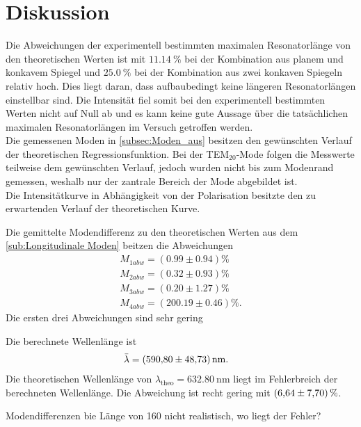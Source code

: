 \section{Diskussion}
\label{sec:Diskussion}

Die Abweichungen der experimentell bestimmten maximalen Resonatorlänge von den theoretischen Werten ist mit $\qty{11.14}{\percent}$ bei der Kombination
aus planem und konkavem Spiegel und $\qty{25.0}{\percent}$ bei der Kombination aus zwei konkaven Spiegeln relativ hoch.
Dies liegt daran, dass aufbaubedingt keine längeren Resonatorlängen einstellbar sind. Die Intensität fiel somit bei den experimentell bestimmten
Werten nicht auf Null ab und es kann keine gute Aussage über die tatsächlichen maximalen Resonatorlängen im Versuch getroffen werden.\\

Die gemessenen Moden in \autoref{subsec:Moden_aus} besitzen den gewünschten Verlauf der theoretischen Regressionsfunktion. Bei der TEM$_{20}$-Mode folgen die Messwerte teilweise dem gewünschten 
Verlauf, jedoch wurden nicht bis zum Modenrand gemessen, weshalb nur der zantrale Bereich der Mode abgebildet ist.\\


Die Intensitätkurve in Abhängigkeit von der Polarisation besitzte den zu erwartenden Verlauf der theoretischen Kurve.

Die gemittelte Modendifferenz zu den theoretischen Werten aus dem \autoref{sub:Longitudinale Moden} beitzen die Abweichungen
\begin{align}
    M_{1 abw} = (0.99 \pm 0.94) \si{\percent}\\
    M_{2 abw} = (0.32 \pm 0.93) \si{\percent}\\
    M_{3 abw} = (0.20 \pm 1.27) \si{\percent}\\
    M_{4 abw} = (200.19 \pm 0.46) \si{\percent}.
\end{align}
Die ersten drei Abweichungen sind sehr gering

Die berechnete Wellenlänge ist 
\begin{align*}
    \bar{\lambda} &= \qty{590.80 \pm 48.73}{\nano\meter}.
\end{align*}
Die theoretischen Wellenlänge von $\lambda_{\text{theo}}= \qty{632.80}{\nano\meter}$ liegt im Fehlerbreich der berechneten Wellenlänge. Die Abweichung ist recht gering mit 
$\qty{6.64 \pm 7.70}{\percent}$.




Modendifferenzen bie Länge von 160 nicht realistisch, wo liegt der Fehler?